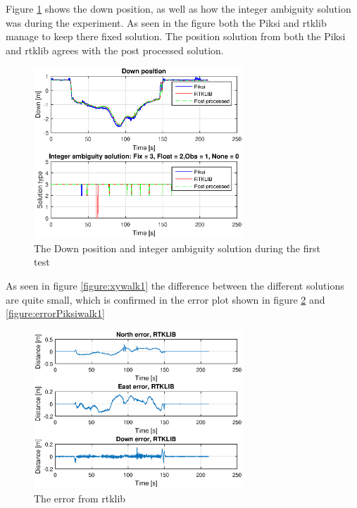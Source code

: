 Figure \ref{figure:DownAndAmbwalk1} shows the down position, as well as how the integer ambiguity solution was during the experiment. As seen in the figure both the Piksi and \gls{rtklib} manage to keep there fixed solution. The position solution from both the Piksi and \gls{rtklib} agrees with the post processed solution. 
\begin{figure}[H]
	\centering
		\includegraphics[width=0.7\textwidth]{figs/plots/downWalk1.eps}
		\caption{The Down position and integer ambiguity solution during the first test}
		\label{figure:DownAndAmbwalk1}
\end{figure}
As seen in figure \ref{figure:xywalk1} the difference between the different solutions are quite small, which is confirmed in the error plot shown in figure \ref{figure:errorRTKwalk1} and \ref{figure:errorPiksiwalk1}
\begin{figure}[H]
	\centering
		\includegraphics[width=0.7\textwidth]{figs/plots/errorRtklibWalk1.eps}
		\caption{The error from \gls{rtklib}}
		\label{figure:errorRTKwalk1}
\end{figure}
